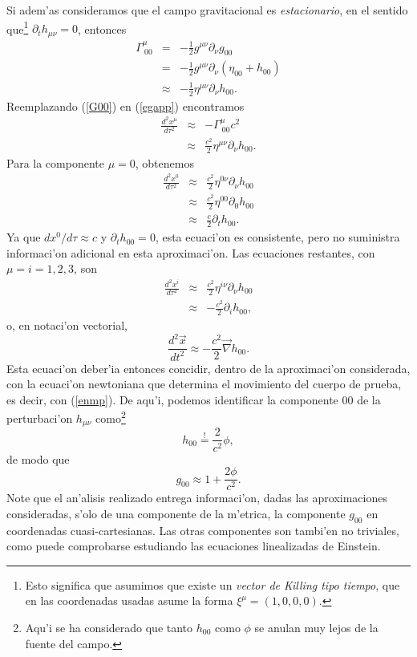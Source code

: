 Si adem'as consideramos que el campo gravitacional es \textit{estacionario}, en el
sentido que\footnote{Esto significa que asumimos que existe un \textit{vector de Killing tipo tiempo}, que en las coordenadas usadas asume la forma $\xi^\mu=(1,0,0,0)$.} $\partial_t h_{\mu\nu}=0$, entonces
\begin{eqnarray}
 \Gamma_{\ 00}^\mu &=&-\frac{1}2g^{\mu\nu}\partial_\nu g_{00} \\
&=&-\frac{1}{2}g^{\mu\nu}
\partial_\nu\left( \eta_{00}+h_{00}\right) \\
&\approx&-\frac{1}2\eta^{\mu\nu}\partial_\nu h_{00}. \label{G00}
\end{eqnarray}
Reemplazando (\ref{G00}) en (\ref{egapp}) encontramos
\begin{eqnarray}
\frac{d^2x^\mu }{d\tau^2}&\approx& -\Gamma_{\ 00}^\mu c^2\\
&\approx& \frac{c^2}2\eta^{\mu\nu}\partial_\nu h_{00} .
\end{eqnarray}
Para la componente $\mu=0$, obtenemos
\begin{eqnarray}
\frac{d^2x^0}{d\tau^2}&\approx& \frac{c^2}2\eta^{0\nu}\partial_\nu h_{00}\\
&\approx& \frac{c^2}{2}\eta^{00}\partial_0 h_{00}\\
&\approx& \frac{c}{2}\partial_t h_{00}.
\end{eqnarray}
Ya que $dx^0/d\tau\approx c$ y $\partial_t h_{00}=0$, esta ecuaci'on es consistente,
pero no suministra informaci'on adicional en esta aproximaci'on. Las ecuaciones
restantes, con $\mu=i=1,2,3$, son
\begin{eqnarray}
\frac{d^2x^i}{d\tau^2}&\approx&\frac{c^2}{2}\eta^{i\nu}\partial_\nu h_{00} \\
&\approx&-\frac{c^2}{2}\partial_i h_{00},
\end{eqnarray}
o, en notaci'on vectorial,
\begin{equation}
 \frac{d^2\vec{x}}{dt^2}\approx -\frac{c^2}{2}\vec{\nabla}h_{00}.
\end{equation}
Esta ecuaci'on deber'ia entonces concidir, dentro de la aproximaci'on considerada,
con la ecuaci'on newtoniana que determina el movimiento del cuerpo de prueba, es decir, con (\ref{enmp}). De aqu'i, podemos
identificar la componente $00$ de la perturbaci'on $h_{\mu\nu}$ como\footnote{Aqu'i se ha considerado que tanto $h_{00}$ como $\phi$ se anulan muy lejos de la fuente del campo.}
\begin{equation}
h_{00}\stackrel{!}{=}\frac{2}{c^2}\phi, \label{h00phi}
\end{equation}
de modo que
\begin{equation}
\boxed{g_{00}\approx 1+\frac{2\phi}{c^2}.} \label{g00phi}
\end{equation}
Note que el an'alisis realizado entrega informaci'on, dadas las aproximaciones consideradas, s'olo de una componente de la m'etrica, la componente $g_{00}$ en coordenadas cuasi-cartesianas. Las otras componentes son tambi'en no triviales, como puede comprobarse estudiando las ecuaciones linealizadas de Einstein. 


